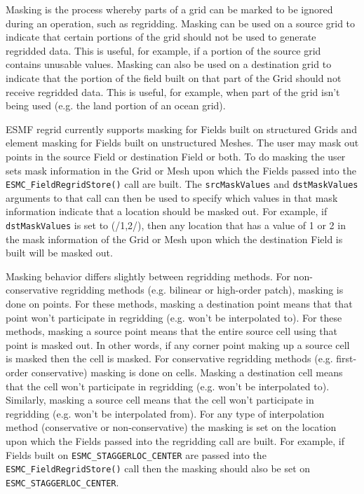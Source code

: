 Masking is the process whereby parts of a grid can be marked to be
ignored during an operation, such as regridding.  Masking can be
used on a source grid to indicate that certain portions of the grid
should not be used to generate regridded data.  This is useful, for
example, if a portion of the source grid contains unusable values.
Masking can also be used on a destination grid to indicate that the
portion of the field built on that part of the Grid should not
receive regridded data.  This is useful, for example, when part of
the grid isn't being used (e.g. the land portion of an ocean grid).

ESMF regrid currently supports masking for Fields built on
structured Grids and element masking for Fields built on
unstructured Meshes. The user may mask out points in the source
Field or destination Field or both. To do masking the user sets
mask information in the Grid 
or Mesh 
upon which the Fields passed into the
{\tt ESMC\_FieldRegridStore()} call are built. The {\tt srcMaskValues} 
and {\tt dstMaskValues} arguments to that
call can then be used to specify which values in that mask
information indicate that a location should be masked out. For
example, if {\tt dstMaskValues} is set to (/1,2/), then any location that
has a value of 1 or 2 in the mask information of the Grid or Mesh
upon which the destination Field is built will be masked out.

Masking behavior differs slightly between regridding methods. For
non-conservative regridding methods (e.g. bilinear or high-order
patch), masking is done on points. For these methods, masking a
destination point means that that point won't participate in
regridding (e.g. won't be interpolated to). For these methods,
masking a source point means that the entire source cell using
that point is masked out. In other words, if any corner point
making up a source cell is masked then the cell is masked. For
conservative regridding methods (e.g. first-order conservative)
masking is done on cells. Masking a destination cell means that
the cell won't participate in regridding (e.g. won't be
interpolated to). Similarly, masking a source cell means that the
cell won't participate in regridding (e.g. won't be interpolated
from).  For any type of interpolation method (conservative or
non-conservative) the masking is set on the location upon
which the Fields passed into the regridding call are built.
For example, if Fields built on  {\tt ESMC\_STAGGERLOC\_CENTER} are
passed into the {\tt ESMC\_FieldRegridStore()} call then the masking
should also be set on {\tt ESMC\_STAGGERLOC\_CENTER}.
